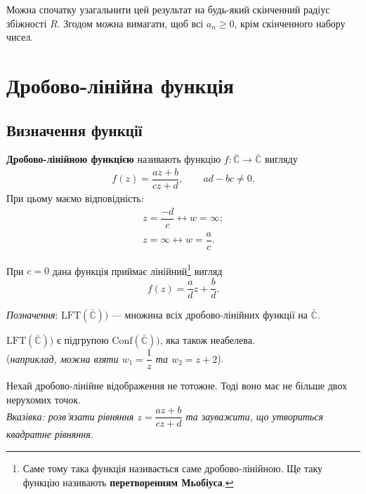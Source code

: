 \documentclass{math_library}
\begin{document}
\begin{remark}
Можна спочатку узагальнити цей результат на будь-який скінченний радіус збіжності $R$. Згодом можна вимагати, щоб всі $a_n \geq 0$, крім скінченного набору чисел.
\end{remark}
\newpage

\section{Дробово-лінійна функція}
\subsection{Визначення функції}
\begin{definition}
\textbf{Дробово-лінійною функцією} називають функцію $f \colon \bar{\mathbb{C}} \to \bar{\mathbb{C}}$ вигляду
\begin{align*}
f(z) = \dfrac{az+b}{cz+d}, \qquad ad - bc \neq 0.
\end{align*}
При цьому маємо відповідність:
\begin{align*}
z = \dfrac{-d}{c} \leftrightarrow w = \infty; \\
z = \infty \leftrightarrow w = \dfrac{a}{c}.
\end{align*}
\end{definition}

\begin{remark}
При $c = 0$ дана функція приймає лінійний\footnote{Саме тому така функція називається саме дробово-лінійною. Ще таку функцію називають \textbf{перетворенням Мьобіуса}.} вигляд
\[
f(z) = \dfrac{a}{d} z + \dfrac{b}{d}.
\]
\end{remark}

\textit{Позначення}: $\text{LFT}(\bar{\mathbb{C}}))$ --- множина всіх дробово-лінійних функції на $\bar{\mathbb{C}}$.

\begin{remark}
$\text{LFT}(\bar{\mathbb{C}}))$ є підгрупою $\text{Conf}(\bar{\mathbb{C}}))$, яка також неабелева.\\
(\textit{наприклад, можна взяти $w_1 = \dfrac{1}{z}$ та $w_2 = z+2$}).
\end{remark}

\begin{proposition}
Нехай дробово-лінійне відображення не тотожне. Тоді воно має не більше двох нерухомих точок.\\
\textit{Вказівка: розв'язати рівняння $z = \dfrac{az+b}{cz+d}$ та зауважити, що утвориться квадратне рівняння.}
\end{proposition}
\end{document}
